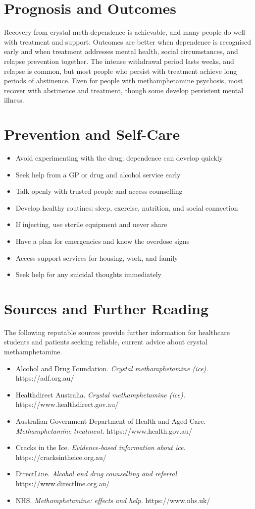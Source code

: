 \section*{Prognosis and Outcomes}
Recovery from crystal meth dependence is achievable, and many people do well with treatment and support. Outcomes are better when dependence is recognised early and when treatment addresses mental health, social circumstances, and relapse prevention together. The intense withdrawal period lasts weeks, and relapse is common, but most people who persist with treatment achieve long periods of abstinence. Even for people with methamphetamine psychosis, most recover with abstinence and treatment, though some develop persistent mental illness.

\section*{Prevention and Self-Care}
\begin{itemize}
    \item Avoid experimenting with the drug; dependence can develop quickly
    \item Seek help from a GP or drug and alcohol service early
    \item Talk openly with trusted people and access counselling
    \item Develop healthy routines: sleep, exercise, nutrition, and social connection
    \item If injecting, use sterile equipment and never share
    \item Have a plan for emergencies and know the overdose signs
    \item Access support services for housing, work, and family
    \item Seek help for any suicidal thoughts immediately
\end{itemize}

\section*{Sources and Further Reading}
The following reputable sources provide further information for healthcare students and patients seeking reliable, current advice about crystal methamphetamine.

\begin{itemize}
    \item Alcohol and Drug Foundation. \textit{Crystal methamphetamine (ice).} https://adf.org.au/
    \item Healthdirect Australia. \textit{Crystal methamphetamine (ice).} https://www.healthdirect.gov.au/
    \item Australian Government Department of Health and Aged Care. \textit{Methamphetamine treatment.} https://www.health.gov.au/
    \item Cracks in the Ice. \textit{Evidence-based information about ice.} https://cracksintheice.org.au/
    \item DirectLine. \textit{Alcohol and drug counselling and referral.} https://www.directline.org.au/
    \item NHS. \textit{Methamphetamine: effects and help.} https://www.nhs.uk/
\end{itemize}
